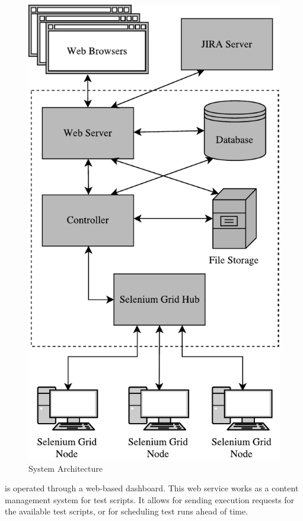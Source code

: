 \begin{figure}[p]
    \centering
    \includegraphics[height=\textheight]{figures/architecture.pdf}
    \caption{System Architecture}
    \label{fig.architecture}
\end{figure}

\toolname \space is operated through a web-based dashboard. This web service works as a content management system for test scripts. It allows for sending execution requests for the available test scripts, or for scheduling test runs ahead of time. 

